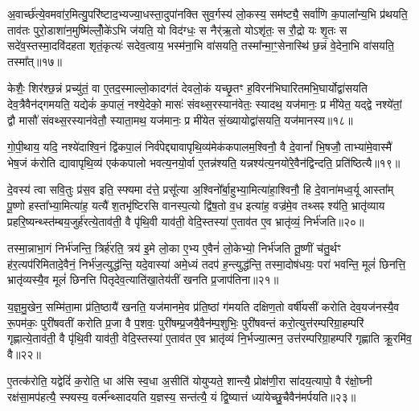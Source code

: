 अ॒वार्च्छ॑त्ये॒वमवा॑र॒मित्यु॒परि॑ष्टाद॒भ्यज्या॒धस्ता॒दुपा॑नक्ति सुव॒र्गस्य॑ लो॒कस्य॒ सम॑ष्ट्यै॒ सर्वा॑णि क॒पाला᳚न्य॒भि प्र॑थयति॒ ताव॑तः पुरो॒डाशा॑न॒मुष्मि॑ल्लोँ॒के॑\-ऽभि ज॑यति॒ यो विद॑ग्धः॒ स नैर्\mbox{}॑ऋ॒तो यो\-ऽशृ॑तः॒ स रौ॒द्रो यः शृ॒तः स सदे॑व॒स्तस्मा॒दवि॑दहता शृतं॒कृत्यः॑ सदेव॒त्वाय॒ भस्म॑ना॒भि वा॑सयति॒ तस्मा᳚न्मा॒ꣳ॒सेनास्थि॑ छ॒न्नं वे॒देना॒भि वा॑सयति॒ तस्मा᳚त्॥१७॥

केशैः॒ शिर॑श्छ॒न्नं प्रच्यु॑तं॒ वा ए॒तद॒स्माल्लो॒कादग॑तं देवलो॒कं यच्छृ॒तꣳ ह॒विरन॑भिघारितमभि॒घार्योद्वा॑सयति देव॒त्रैवैन॑द्गमयति॒ यद्येकं॑ क॒पालं॒ नश्ये॒देको॒ मासः॑ संवथ्स॒रस्यान॑वेतः॒ स्यादथ॒ यज॑मानः॒ प्र मी॑येत॒ यद्द्वे नश्ये॑तां॒ द्वौ मासौ॑ संवथ्स॒रस्यान॑वेतौ॒ स्याता॒मथ॒ यज॑मानः॒ प्र मी॑येत सं॒ख्यायोद्वा॑सयति॒ यज॑मानस्य॥१८॥

गो॒पी॒थाय॒ यदि॒ नश्ये॑दाश्वि॒नं द्वि॑कपा॒लं निर्व॑पेद्द्यावापृथि॒व्य॑मेक॑कपालम॒श्विनौ॒ वै दे॒वानां᳚ भि॒षजौ॒ ताभ्या॑मे॒वास्मै॑ भेष॒जं क॑रोति द्यावापृथि॒व्य॑ एक॑कपालो भवत्य॒नयो॒र्वा ए॒तन्न॑श्यति॒ यन्नश्य॑त्य॒नयो॑रे॒वैन॑द्विन्दति॒ प्रति॑ष्ठित्यै॥१९॥

{\anuvakamend[{प्रा॒जा॒प॒त्यन्ते\-ऽक्षो\-ऽनु॑पाक्तो वे॒देना॒भि वा॑सयति॒ तस्मा॒द्यज॑मानस्य॒ द्वात्रिꣳ॑शच्च॥३॥}]}

दे॒वस्य॑ त्वा सवि॒तुः प्र॑स॒व इति॒ स्फ्यमा द॑त्ते॒ प्रसू᳚त्या अ॒श्विनो᳚र्बा॒हुभ्या॒मित्या॑हा॒श्विनौ॒ हि दे॒वाना॑मध्व॒र्यू आस्ता᳚म् पू॒ष्णो हस्ता᳚भ्या॒मित्या॑ह॒ यत्यै॑ श॒तभृ॑ष्टिरसि वानस्प॒त्यो द्वि॑ष॒तो व॒ध इत्या॑ह॒ वज्र॑मे॒व तथ्सꣴ श्य॑ति॒ भ्रातृ॑व्याय प्रहरि॒ष्यन्थ्स्त॑म्बय॒जुर्\mbox{}ह॑रत्ये॒ताव॑ती॒ वै पृ॑थि॒वी याव॑ती॒ वेदि॒स्तस्या॑ ए॒ताव॑त ए॒व भ्रातृ॑व्यं॒ निर्भ॑जति॥२०॥

तस्मा॒न्नाभा॒गं निर्भ॑जन्ति॒ त्रिर्\mbox{}ह॑रति॒ त्रय॑ इ॒मे लो॒का ए॒भ्य ए॒वैनं॑ लो॒केभ्यो॒ निर्भ॑जति तू॒ष्णीं च॑तु॒र्थꣳ ह॑र॒त्यप॑रिमितादे॒वैनं॒ निर्भ॑ज॒त्युद्ध॑न्ति॒ यदे॒वास्या॑ अमे॒ध्यं तदप॑ ह॒न्त्युद्ध॑न्ति॒ तस्मा॒दोष॑धयः॒ परा॑ भवन्ति॒ मूलं॑ छिनत्ति॒ भ्रातृ॑व्यस्यै॒व मूलं॑ छिनत्ति पितृदेव॒त्याति॑खा॒तेय॑तीं खनति प्र॒जाप॑तिना॥२१॥

य॒ज्ञ॒मु॒खेन॒ सम्मि॑ता॒मा प्र॑ति॒ष्ठायै॑ खनति॒ यज॑मानमे॒व प्र॑ति॒ष्ठां ग॑मयति दक्षिण॒तो वर्\mbox{}षी॑यसीं करोति देव॒यज॑नस्यै॒व रू॒पम॑कः॒ पुरी॑षवतीं करोति प्र॒जा वै प॒शवः॒ पुरी॑षम्प्र॒जयै॒वैन॑म्प॒शुभिः॒ पुरी॑षवन्तं करो॒त्युत्त॑रम्परिग्रा॒हम्परि॑ गृह्णात्ये॒ताव॑ती॒ वै पृ॑थि॒वी याव॑ती॒ वेदि॒स्तस्या॑ ए॒ताव॑त ए॒व भ्रातृ॑व्यं नि॒र्भज्या॒त्मन॒ उत्त॑रम्परिग्रा॒हम्परि॑ गृह्णाति क्रू॒रमि॑व॒ वै॥२२॥

ए॒तत्क॑रोति॒ यद्वेदिं॑ क॒रोति॒ धा अ॑सि स्व॒धा अ॒सीति॑ योयुप्यते॒ शान्त्यै॒ प्रोक्ष॑णी॒रा सा॑दय॒त्यापो॒ वै र॑क्षो॒घ्नी रक्ष॑सा॒मप॑हत्यै॒ स्फ्यस्य॒ वर्त्म᳚न्थ्सादयति य॒ज्ञस्य॒ सन्त॑त्यै॒ यं द्वि॒ष्यात्तं ध्या॑येच्छु॒चैवैन॑मर्पयति॥२३॥


